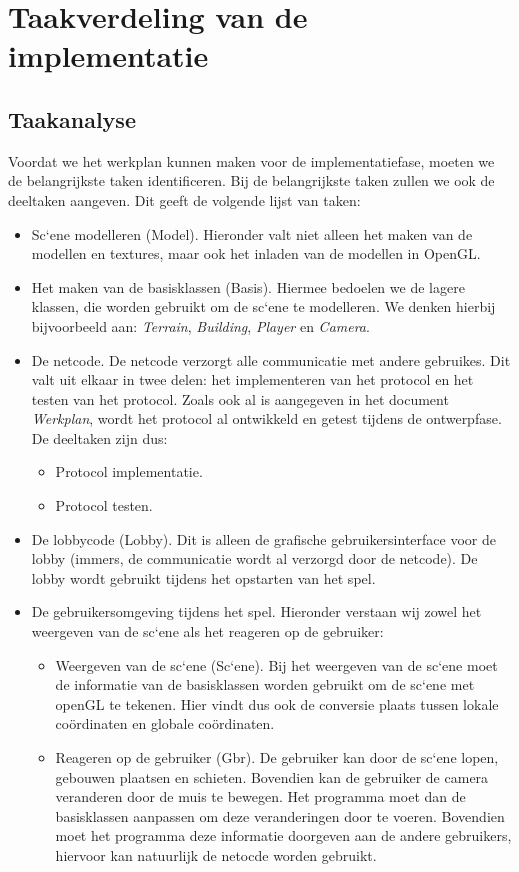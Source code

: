 \documentclass[a4paper,11pt]{article}
\begin{document}
\section{Taakverdeling van de implementatie}
    \subsection{Taakanalyse}
    Voordat we het werkplan kunnen maken voor de implementatiefase, moeten we de belangrijkste taken identificeren. Bij de belangrijkste taken zullen we ook de deeltaken aangeven. Dit geeft de volgende lijst van taken:
    \begin{itemize}
    \item Sc`ene modelleren (Model). Hieronder valt niet alleen het maken van de modellen en textures, maar ook het inladen van de modellen in OpenGL.
    \item Het maken van de basisklassen (Basis). Hiermee bedoelen we de lagere klassen, die worden gebruikt om de sc`ene te modelleren. We denken hierbij bijvoorbeeld aan: \emph{Terrain}, \emph{Building}, \emph{Player} en \emph{Camera}.
    \item De netcode. De netcode verzorgt alle communicatie met andere gebruikes. Dit valt uit elkaar in twee delen: het implementeren van het protocol en het testen van het protocol. Zoals ook al is aangegeven in het document \emph{Werkplan}, wordt het protocol al ontwikkeld en getest tijdens de ontwerpfase. De deeltaken zijn dus:
        \begin{itemize}
        \item Protocol implementatie.
        \item Protocol testen.
        \end{itemize}
    \item De lobbycode (Lobby). Dit is alleen de grafische gebruikersinterface voor de lobby (immers, de communicatie wordt al verzorgd door de netcode). De lobby wordt gebruikt tijdens het opstarten van het spel.
    \item De gebruikersomgeving tijdens het spel. Hieronder verstaan wij zowel het weergeven van de sc`ene als het reageren op de gebruiker:
        \begin{itemize}
        \item Weergeven van de sc`ene (Sc`ene). Bij het weergeven van de sc`ene moet de informatie van de basisklassen worden gebruikt om de sc`ene met openGL te tekenen. Hier vindt dus ook de conversie plaats tussen lokale co\"ordinaten en globale co\"ordinaten.
        \item Reageren op de gebruiker (Gbr). De gebruiker kan door de sc`ene lopen, gebouwen plaatsen en schieten. Bovendien kan de gebruiker de camera veranderen door de muis te bewegen. Het programma moet dan de basisklassen aanpassen om deze veranderingen door te voeren. Bovendien moet het programma deze informatie doorgeven aan de andere gebruikers, hiervoor kan natuurlijk de netocde worden gebruikt.
        \end{itemize}
    \end{itemize}
\end{document}
